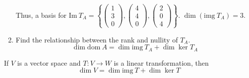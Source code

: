 \documentclass[11pt,fleqn]{book} %
\begin{document}
\begin{example}
\begin{enumerate}
        Thus, a basis for $\mathrm{Im}~T_A = \left\{ \begin{pmatrix} 1\\3\\0 \end{pmatrix}, \begin{pmatrix} 4\\4\\0 \end{pmatrix}, \begin{pmatrix} 2\\0\\4 \end{pmatrix} \right\}$. $\dim\left( \mathrm{img}~T_A \right) = 3$. 

        \item Find the relationship between the rank and nullity of $T_A$. 
        $$\dim \mathrm{dom}~A = \dim \mathrm{img}~T_A + \dim \ker  T_A $$
    \end{enumerate}
\end{example}

\setcounter{section}{3}
\setcounter{dummy}{16}
\begin{theorem}
    If $V$ is a  vector space and $T: V \to W$ is a linear transformation, then $$\dim V = \dim \mathrm{img}~T + \dim \ker T$$
\end{theorem}
\setcounter{section}{2}
\end{document}
